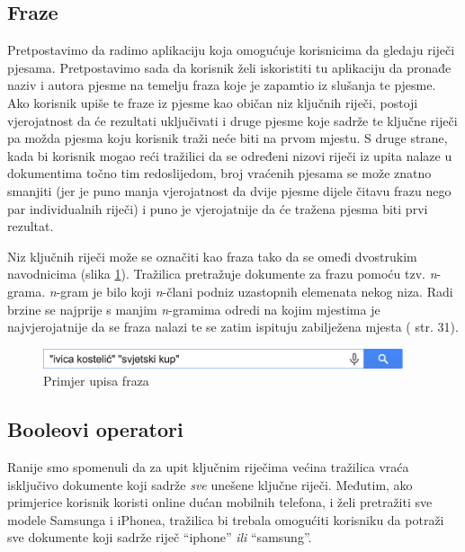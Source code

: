 \documentclass[a4paper,twoside,12pt]{scrreprt}
\begin{document}
\subsection{Fraze}

Pretpostavimo da radimo aplikaciju koja omogućuje korisnicima da gledaju riječi pjesama. Pretpostavimo sada da korisnik želi iskoristiti tu aplikaciju da pronađe naziv i autora pjesme na temelju fraza koje je zapamtio iz slušanja te pjesme. Ako korisnik upiše te fraze iz pjesme kao običan niz ključnih riječi, postoji vjerojatnost da će rezultati uključivati i druge pjesme koje sadrže te ključne riječi pa možda pjesma koju korisnik traži neće biti na prvom mjestu. S druge strane, kada bi korisnik mogao reći tražilici da se određeni nizovi riječi iz upita nalaze u dokumentima točno tim redoslijedom, broj vraćenih pjesama se može znatno smanjiti (jer je puno manja vjerojatnost da dvije pjesme dijele čitavu frazu nego par individualnih riječi) i puno je vjerojatnije da će tražena pjesma biti prvi rezultat.

Niz ključnih riječi može se označiti kao fraza tako da se omeđi dvostrukim navodnicima (slika \ref{phrases}). Tražilica pretražuje dokumente za frazu pomoću tzv. \textit{n}-grama. \textit{n}-gram je bilo koji \textit{n}-člani podniz uzastopnih elemenata nekog niza. Radi brzine se najprije s manjim \textit{n}-gramima odredi na kojim mjestima je najvjerojatnije da se fraza nalazi te se zatim ispituju zabilježena mjesta (\cite{taming} str. 31).

\begin{figure}[H]
  \centering
  \includegraphics[width=300pt]{phrases}
  \caption{Primjer upisa fraza}
  \label{phrases}
\end{figure}

\subsection{Booleovi operatori}

Ranije smo spomenuli da za upit ključnim riječima većina tražilica vraća isključivo dokumente koji sadrže \textit{sve} unešene ključne riječi. Međutim, ako primjerice korisnik koristi online dućan mobilnih telefona, i želi pretražiti sve modele Samsunga i iPhonea, tražilica bi trebala omogućiti korisniku da potraži sve dokumente koji sadrže riječ ``iphone'' \textit{ili} ``samsung''.
\end{document}
